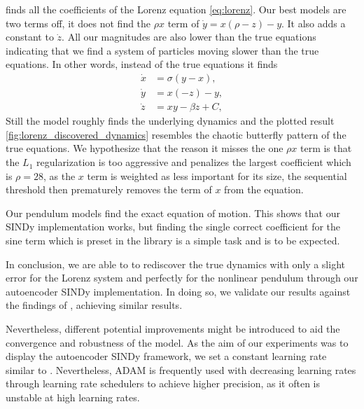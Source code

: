 \textcite{Champion_2019} finds all the coefficients of the Lorenz equation \autoref{eq:lorenz}. Our best models are two terms off, it does not find the $\rho x$ term of $\dot{y} = x (\rho - z) - y$. It also adds a constant to $\dot{z}$. All our magnitudes are also lower than the true equations indicating that we find a system of particles moving slower than the true equations. In other words, instead of the true equations it finds
\begin{equation*}
\begin{aligned}
    \dot{x} &= \sigma (y - x), \\
    \dot{y} &= x (- z) - y, \\
    \dot{z} &= x y - \beta z + C,
\end{aligned}
\end{equation*}
Still the model roughly finds the underlying dynamics and the plotted result \autoref{fig:lorenz_discovered_dynamics} resembles the chaotic butterfly pattern of the true equations. We hypothesize that the reason it misses the one $\rho x$ term is that the $L_1$ regularization is too aggressive and penalizes the largest coefficient which is $\rho= 28$, as the $x$ term is weighted as less important for its size, the sequential threshold then prematurely removes the term of $x$ from the equation.


Our pendulum models find the exact equation of motion. This shows that our SINDy implementation works, but finding the single correct coefficient for the sine term which is preset in the library is a simple task and is to be expected.

In conclusion, we are able to to rediscover the true dynamics with only a slight error for the Lorenz system and perfectly for the nonlinear pendulum through our autoencoder SINDy implementation. 
In doing so, we validate our results against the findings of \textcite{Champion_2019}, achieving similar results. 

Nevertheless, different potential improvements might be introduced to aid the convergence and robustness of the model. 
As the aim of our experiments was to display the autoencoder SINDy framework, we set a constant learning rate similar to \textcite{Champion_2019}. 
Nevertheless, \textsc{ADAM} is frequently used with decreasing learning rates through learning rate schedulers to achieve higher precision, as it often is unstable at high learning rates. 

